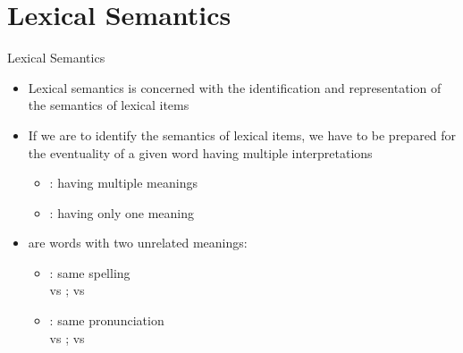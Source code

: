 \documentclass{beamer}
\begin{document}
\section{Lexical Semantics}

\begin{frame}{Lexical Semantics}

\begin{itemize}
\item Lexical semantics is concerned with the identification and
  representation of the semantics of lexical items
\item If we are to identify the semantics of lexical items, we have to
  be prepared for the eventuality of a given word having 
  multiple interpretations
  \begin{itemize}
  \item {}: having multiple meanings
  \item {}: having only one meaning
  \end{itemize}
\item {} are words with two unrelated meanings:
  \begin{itemize}
  \item {}: same spelling 
    \\  vs ;  vs 
  \item {}: same pronunciation
     \\  vs ;  vs 
  \end{itemize}

\end{itemize}





\end{frame}



\end{document}
